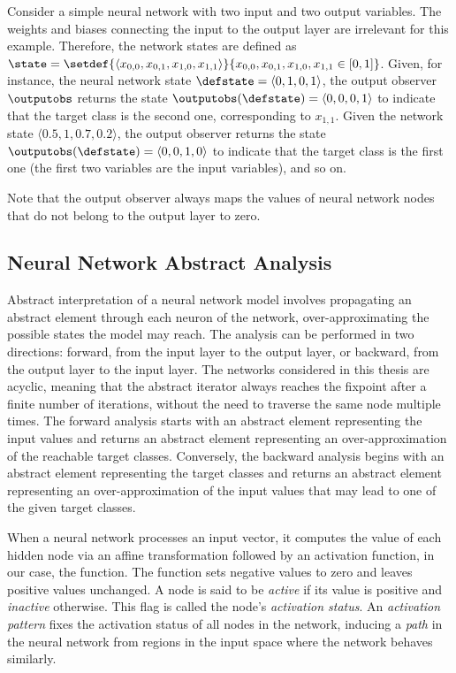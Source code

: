 \begin{example}
Consider a simple neural network with two input and two output variables. The weights and biases connecting the input to the output layer are irrelevant for this example. Therefore, the network states are defined as $\state = \setdef{\langle x_{0, 0}, x_{0, 1}, x_{1, 0}, x_{1, 1} \rangle}{x_{0, 0}, x_{0, 1}, x_{1, 0}, x_{1, 1} \in [0,1]}$.
Given, for instance, the neural network state $\defstate=\langle 0, 1, 0, 1 \rangle$, the output observer $\outputobs$ returns the state $\outputobs(\defstate) = \langle 0, 0, 0, 1 \rangle$ to indicate that the target class is the second one, corresponding to $x_{1, 1}$. Given the network state $\langle 0.5, 1, 0.7, 0.2 \rangle$, the output observer returns the state $\outputobs(\defstate) = \langle 0, 0, 1, 0 \rangle$ to indicate that the target class is the first one (the first two variables are the input variables), and so on.
\end{example}

Note that the output observer always maps the values of neural network nodes that do not belong to the output layer to zero.

\subsection{Neural Network Abstract Analysis}

Abstract interpretation of a neural network model involves propagating an abstract element through each neuron of the network, over-approximating the possible states the model may reach. The analysis can be performed in two directions: forward, from the input layer to the output layer, or backward, from the output layer to the input layer.
The networks considered in this thesis are acyclic, meaning that the abstract iterator always reaches the fixpoint after a finite number of iterations, without the need to traverse the same node multiple times.
The forward analysis starts with an abstract element representing the input values and returns an abstract element representing an over-approximation of the reachable target classes. Conversely, the backward analysis begins with an abstract element representing the target classes and returns an abstract element representing an over-approximation of the input values that may lead to one of the given target classes.

When a neural network processes an input vector, it computes the value of each hidden node via an affine transformation followed by an activation function, in our case, the \relu{} function. The \relu{} function sets negative values to zero and leaves positive values unchanged. A node is said to be \emph{active} if its value is positive and \emph{inactive} otherwise. This flag is called the node's \emph{activation status}. An \emph{activation pattern} fixes the activation status of all nodes in the network, inducing a \emph{path} in the neural network from
regions in the input space where the network behaves similarly.


